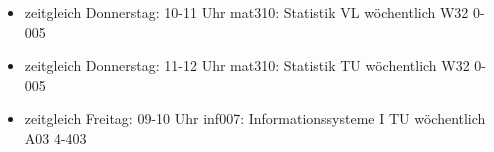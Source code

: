 \documentclass[a4paper,10pt]{report}
\begin{document}
	\hfill

	\begin{itemize}
		\item \large{zeitgleich Donnerstag: 10-11 Uhr mat310: Statistik VL wöchentlich W32 0-005}
		\item \large{zeitgleich Donnerstag: 11-12 Uhr mat310: Statistik TU wöchentlich W32 0-005}
		\item \large{zeitgleich Freitag: 09-10 Uhr inf007: Informationssysteme I TU wöchentlich A03 4-403}
	\end{itemize}
\end{document}
